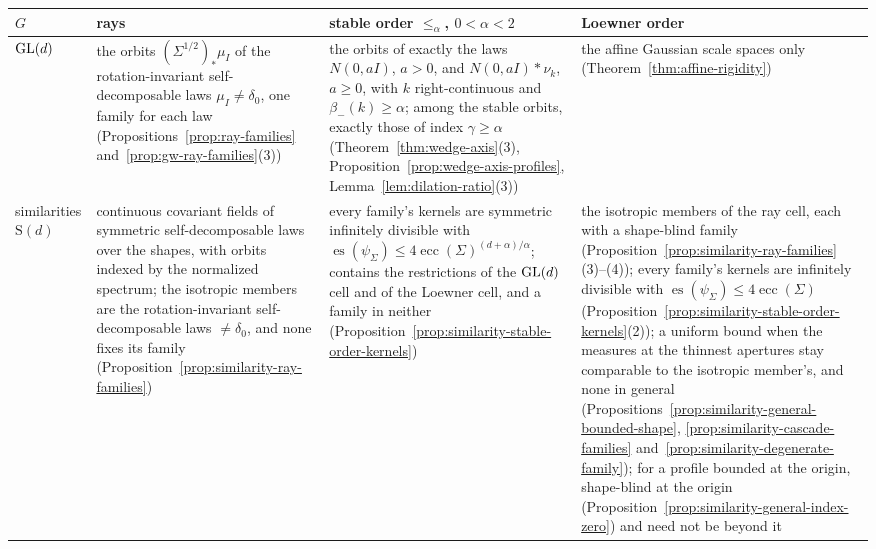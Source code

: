 \begin{table}[tp]
\centering
\small
\setlength{\tabcolsep}{4pt}
\renewcommand{\arraystretch}{1.15}
\begin{tabular}{@{}p{}p{}p{}p{}@{}}
\toprule
$G$ & rays & stable order $\le_\alpha$, $0 < \alpha < 2$ & Loewner order \\
\midrule
$\mathrm{GL}(d)$ &
the orbits $(\Sigma^{1/2})_*\mu_I$ of the rotation-invariant self-decomposable laws $\mu_I \ne \delta_0$,
one family for each law (Propositions~\ref{prop:ray-families} and~\ref{prop:gw-ray-families}(3)) &
the orbits of exactly the laws $N(0, aI)$, $a > 0$, and $N(0, aI) * \nu_k$, $a \ge 0$, with $k$
right-continuous and $\beta_-(k) \ge \alpha$; among the stable orbits, exactly those of index $\gamma \ge \alpha$
(Theorem~\ref{thm:wedge-axis}(3), Proposition~\ref{prop:wedge-axis-profiles},
Lemma~\ref{lem:dilation-ratio}(3)) &
the affine Gaussian scale spaces only (Theorem~\ref{thm:affine-rigidity}) \\
\addlinespace
similarities $\mathrm S(d)$ &
continuous covariant fields of symmetric self-decomposable laws over the shapes, with orbits indexed by
the normalized spectrum; the isotropic members are the rotation-invariant self-decomposable laws
$\ne \delta_0$, and none fixes its family (Proposition~\ref{prop:similarity-ray-families}) &
every family's kernels are symmetric infinitely divisible with
$\operatorname{es}(\psi_\Sigma) \le 4\operatorname{ecc}(\Sigma)^{(d+\alpha)/\alpha}$; contains the restrictions of
the $\mathrm{GL}(d)$ cell and of the Loewner cell, and a family in neither
(Proposition~\ref{prop:similarity-stable-order-kernels}) &
the isotropic members of the ray cell, each with a shape-blind family
(Proposition~\ref{prop:similarity-ray-families}(3)--(4)); every family's kernels are infinitely divisible with
$\operatorname{es}(\psi_\Sigma) \le 4\operatorname{ecc}(\Sigma)$
(Proposition~\ref{prop:similarity-stable-order-kernels}(2)); a uniform bound when the \Levy{} measures
at the thinnest apertures stay comparable to the isotropic member's, and none in general
(Propositions~\ref{prop:similarity-general-bounded-shape}, \ref{prop:similarity-cascade-families}
and~\ref{prop:similarity-degenerate-family}); for a profile bounded at the origin, shape-blind at the
origin (Proposition~\ref{prop:similarity-general-index-zero}) and need not be beyond it

\end{tabular}
\end{table}
